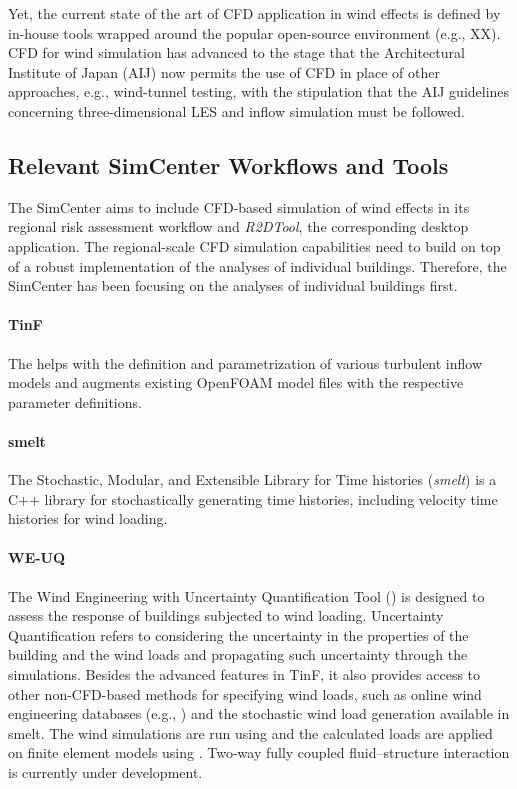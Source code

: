 Yet, the current state of the art of CFD application in wind effects is defined by in-house tools wrapped around the popular open-source  environment (e.g., XX). CFD for wind simulation has advanced to the stage that the Architectural Institute of Japan (AIJ) now permits the use of CFD in place of other approaches, e.g., wind-tunnel testing, with the stipulation that the AIJ guidelines concerning three-dimensional LES and inflow simulation must be followed.

\subsection{Relevant SimCenter Workflows and Tools} 

The SimCenter aims to include CFD-based simulation of wind effects in its regional risk assessment workflow and \emph{R2DTool}, the corresponding desktop application. The regional-scale CFD simulation capabilities need to build on top of a robust implementation of the analyses of individual buildings. Therefore, the SimCenter has been focusing on the analyses of individual buildings first. 

\paragraph{TinF} The  helps with the definition and parametrization of various turbulent inflow models and augments existing OpenFOAM model files with the respective parameter definitions. 

\paragraph{smelt}
The Stochastic, Modular, and Extensible Library for Time histories (\emph{smelt}) is a C++ library for stochastically generating time histories, including velocity time histories for wind loading. 

\paragraph{WE-UQ} The Wind Engineering with Uncertainty Quantification Tool () is designed to assess the response of buildings subjected to wind loading. Uncertainty Quantification refers to considering the uncertainty in the properties of the building and the wind loads and propagating such uncertainty through the simulations. Besides the advanced features in TinF, it also provides access to other non-CFD-based methods for specifying wind loads, such as online wind engineering databases (e.g., \cite{tpu2020tpu}) and the stochastic wind load generation available in smelt. The wind simulations are run using  and the calculated loads are applied on finite element models using . Two-way fully coupled fluid--structure interaction is currently under development.

